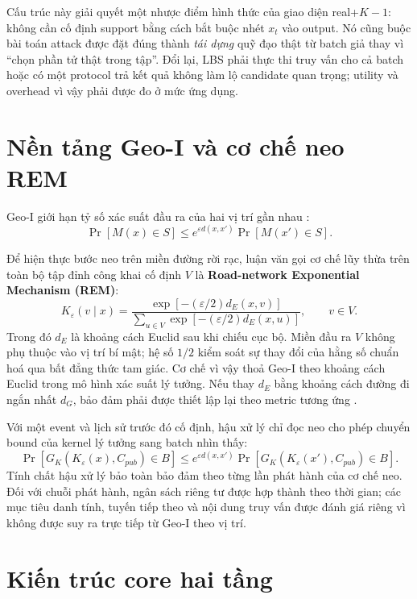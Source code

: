 \documentclass[12pt,a4paper,oneside]{report}
\begin{document}
Cấu trúc này giải quyết một nhược điểm hình thức của giao diện real+$K-1$: không cần cố định support bằng cách bắt buộc nhét $x_t$ vào output. Nó cũng buộc bài toán attack được đặt đúng thành \emph{tái dựng} quỹ đạo thật từ batch giả thay vì ``chọn phần tử thật trong tập''. Đổi lại, LBS phải thực thi truy vấn cho cả batch hoặc có một protocol trả kết quả không làm lộ candidate quan trọng; utility và overhead vì vậy phải được đo ở mức ứng dụng.

\section{Nền tảng Geo-I và cơ chế neo REM}

Geo-I giới hạn tỷ số xác suất đầu ra của hai vị trí gần nhau \citep{andres2013geo}:
\begin{equation}
\Pr[M(x)\in S]
\leq e^{\varepsilon d(x,x')}
\Pr[M(x')\in S].
\label{eq:geoi}
\end{equation}

Để hiện thực bước neo trên miền đường rời rạc, luận văn gọi cơ chế lũy thừa trên toàn bộ tập đỉnh công khai cố định $V$ là \textbf{Road-network Exponential Mechanism (REM)}:
\begin{equation}
K_{\varepsilon}(v\mid x)
=\frac{\exp[-(\varepsilon/2)d_E(x,v)]}
{\sum_{u\in V}\exp[-(\varepsilon/2)d_E(x,u)]},\qquad v\in V.
\label{eq:rem-kernel}
\end{equation}
Trong đó $d_E$ là khoảng cách Euclid sau khi chiếu cục bộ. Miền đầu ra $V$ không phụ thuộc vào vị trí bí mật; hệ số $1/2$ kiểm soát sự thay đổi của hằng số chuẩn hoá qua bất đẳng thức tam giác. Cơ chế vì vậy thoả Geo-I theo khoảng cách Euclid trong mô hình xác suất lý tưởng. Nếu thay $d_E$ bằng khoảng cách đường đi ngắn nhất $d_G$, bảo đảm phải được thiết lập lại theo metric tương ứng \citep{takagi2019ggi}.

Với một event và lịch sử trước đó cố định, hậu xử lý chỉ đọc neo cho phép chuyển bound của kernel lý tưởng sang batch nhìn thấy:
\[
\Pr[G_K(K_{\varepsilon}(x),C_{pub})\in B]
\le e^{\varepsilon d(x,x')}
\Pr[G_K(K_{\varepsilon}(x'),C_{pub})\in B].
\]
Tính chất hậu xử lý bảo toàn bảo đảm theo từng lần phát hành của cơ chế neo. Đối với chuỗi phát hành, ngân sách riêng tư được hợp thành theo thời gian; các mục tiêu danh tính, tuyến tiếp theo và nội dung truy vấn được đánh giá riêng vì không được suy ra trực tiếp từ Geo-I theo vị trí.

\section{Kiến trúc core hai tầng}
\end{document}
